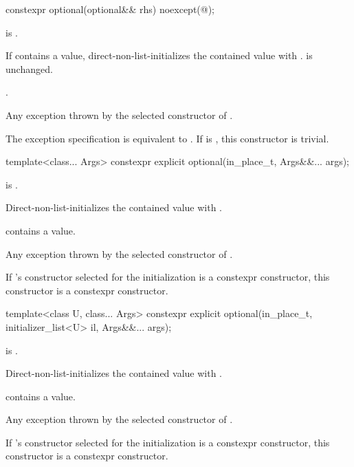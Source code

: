 %
\begin{itemdecl}
constexpr optional(optional&& rhs) noexcept(@\seebelow@);
\end{itemdecl}

\begin{itemdescr}
\pnum
\constraints
{} is .

\pnum
\effects
If  contains a value, direct-non-list-initializes the contained value
with .
 is unchanged.

\pnum
\ensures
{}.

\pnum
\throws
Any exception thrown by the selected constructor of .

\pnum
\remarks
The exception specification is equivalent to
.
If  is ,
this constructor is trivial.
\end{itemdescr}

%
\begin{itemdecl}
template<class... Args> constexpr explicit optional(in_place_t, Args&&... args);
\end{itemdecl}

\begin{itemdescr}
\pnum
\constraints
{} is .

\pnum
\effects
Direct-non-list-initializes the contained value with .

\pnum
\ensures
{} contains a value.

\pnum
\throws
Any exception thrown by the selected constructor of .

\pnum
\remarks
If 's constructor selected for the initialization is a constexpr constructor, this constructor is a constexpr constructor.
\end{itemdescr}

%
\begin{itemdecl}
template<class U, class... Args>
  constexpr explicit optional(in_place_t, initializer_list<U> il, Args&&... args);
\end{itemdecl}

\begin{itemdescr}
\pnum
\constraints
{} is .

\pnum
\effects
Direct-non-list-initializes the contained value with .

\pnum
\ensures
{} contains a value.

\pnum
\throws
Any exception thrown by the selected constructor of .

\pnum
\remarks
If 's constructor selected for the initialization is a constexpr constructor, this constructor is a constexpr constructor.
\end{itemdescr}

